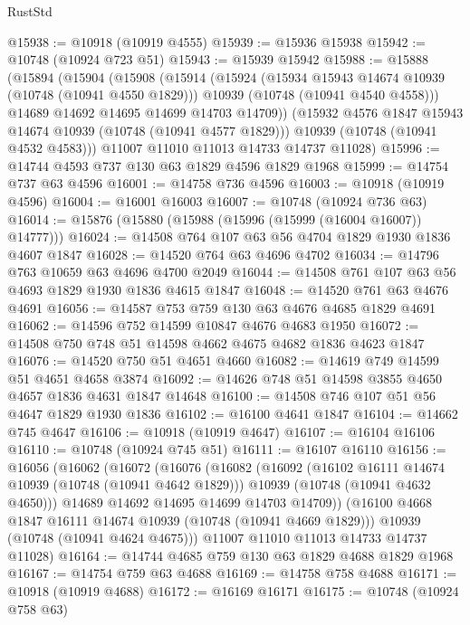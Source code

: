\begin{lexlean}{RustStd}
\begin{coremodule}
@15938 := @10918 (@10919 @4555)
@15939 := @15936 @15938
@15942 := @10748 (@10924 @723 @51)
@15943 := @15939 @15942
@15988 := @15888
    (@15894
      (@15904
        (@15908
          (@15914
            (@15924
              (@15934 @15943 @14674 @10939 (@10748 (@10941 @4550 @1829)))
              @10939
              (@10748 (@10941 @4540 @4558)))
            @14689
            @14692
            @14695
            @14699
            @14703
            @14709))
        (@15932 @4576 @1847 @15943 @14674 @10939 (@10748 (@10941 @4577 @1829)))
        @10939
        (@10748 (@10941 @4532 @4583)))
      @11007
      @11010
      @11013
      @14733
      @14737
      @11028)
@15996 := @14744 @4593 @737 @130 @63 @1829 @4596 @1829 @1968
@15999 := @14754 @737 @63 @4596
@16001 := @14758 @736 @4596
@16003 := @10918 (@10919 @4596)
@16004 := @16001 @16003
@16007 := @10748 (@10924 @736 @63)
@16014 := @15876 (@15880 (@15988 (@15996 (@15999 (@16004 @16007)) @14777)))
@16024 := @14508 @764 @107 @63 @56 @4704 @1829 @1930 @1836 @4607 @1847
@16028 := @14520 @764 @63 @4696 @4702
@16034 := @14796 @763 @10659 @63 @4696 @4700 @2049
@16044 := @14508 @761 @107 @63 @56 @4693 @1829 @1930 @1836 @4615 @1847
@16048 := @14520 @761 @63 @4676 @4691
@16056 := @14587 @753 @759 @130 @63 @4676 @4685 @1829 @4691
@16062 := @14596 @752 @14599 @10847 @4676 @4683 @1950
@16072 := @14508 @750 @748 @51 @14598 @4662 @4675 @4682 @1836 @4623 @1847
@16076 := @14520 @750 @51 @4651 @4660
@16082 := @14619 @749 @14599 @51 @4651 @4658 @3874
@16092 := @14626 @748 @51 @14598 @3855 @4650 @4657 @1836 @4631 @1847 @14648
@16100 := @14508 @746 @107 @51 @56 @4647 @1829 @1930 @1836
@16102 := @16100 @4641 @1847
@16104 := @14662 @745 @4647
@16106 := @10918 (@10919 @4647)
@16107 := @16104 @16106
@16110 := @10748 (@10924 @745 @51)
@16111 := @16107 @16110
@16156 := @16056
    (@16062
      (@16072
        (@16076
          (@16082
            (@16092
              (@16102 @16111 @14674 @10939 (@10748 (@10941 @4642 @1829)))
              @10939
              (@10748 (@10941 @4632 @4650)))
            @14689
            @14692
            @14695
            @14699
            @14703
            @14709))
        (@16100 @4668 @1847 @16111 @14674 @10939 (@10748 (@10941 @4669 @1829)))
        @10939
        (@10748 (@10941 @4624 @4675)))
      @11007
      @11010
      @11013
      @14733
      @14737
      @11028)
@16164 := @14744 @4685 @759 @130 @63 @1829 @4688 @1829 @1968
@16167 := @14754 @759 @63 @4688
@16169 := @14758 @758 @4688
@16171 := @10918 (@10919 @4688)
@16172 := @16169 @16171
@16175 := @10748 (@10924 @758 @63)

\end{coremodule}
\end{lexlean}
